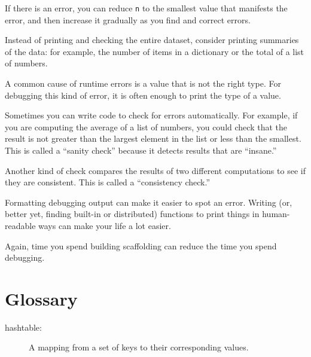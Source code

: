\documentclass[10pt]{book}
\begin{document}
{\begin{description}
If there is an error, you can reduce {\tt n} to the smallest
value that manifests the error, and then increase it gradually
as you find and correct errors.

\item[Check summaries and types:] Instead of printing and checking the
entire dataset, consider printing summaries of the data: for example,
the number of items in a dictionary or the total of a list of numbers.

A common cause of runtime errors is a value that is not the right
type.  For debugging this kind of error, it is often enough to print
the type of a value.

\item[Write self-checks:]  Sometimes you can write code to check
for errors automatically.  For example, if you are computing the
average of a list of numbers, you could check that the result is
not greater than the largest element in the list or less than
the smallest.  This is called a ``sanity check'' because it detects
results that are ``insane.''


Another kind of check compares the results of two different
computations to see if they are consistent.  This is called a
``consistency check.''

\item[Pretty print the output:] Formatting debugging output
can make it easier to spot an error. Writing (or, better yet,
finding built-in or distributed) functions to print things in
human-readable ways can make your life a lot easier.


\end{description}

Again, time you spend building scaffolding can reduce
the time you spend debugging.


\section{Glossary}

\begin{description}

\item[hashtable:] A mapping from a set of keys to their
corresponding values.


\end{description}}
\end{document}
